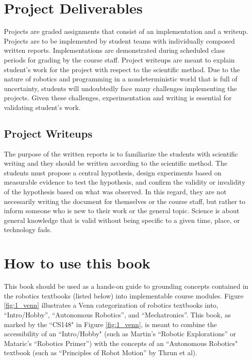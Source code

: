 \section{Project Deliverables}

Projects are graded assignments that consist of an implementation and a writeup.  Projects are to be implemented by student teams with individually composed written reports.  Implementations are demonstrated during scheduled class periods for grading by the course staff.  Project writeups are meant to explain student's work for the project with respect to the scientific method.  Due to the nature of robotics and programming in a nondeterministic world that is full of uncertainty, students will undoubtedly face many challenges implementing the projects. Given these challenges, experimentation and writing is essential for validating student's work.

\subsection{Project Writeups}

The purpose of the written reports is to familiarize the students with scientific writing and they should be written according to the scientific method.  The students must propose a central hypothesis, design experiments based on measurable evidence to test the hypothesis, and confirm the validity or invalidity of the hypothesis based on what was observed.  In this regard, they are not necessarily writing the document for themselves or the course staff, but rather to inform someone who is new to their work or the general topic.  Science is about general knowledge that is valid without being specific to a given time, place, or technology fads.

\section{How to use this book}

This book should be used as a hands-on guide to grounding concepts contained in the robotics textbooks (listed below) into implementable course modules.  Figure \ref{fig:1_venn} illustrates a Venn categorization of 
robotics textbooks into, ``Intro/Hobby'', ``Autonomous Robotics'', and ``Mechatronics''.  This book, as marked by the ``CS148" in Figure \ref{fig:1_venn}, is meant to combine the accessibility of an ``Intro/Hobby" (such as Martin's ``Robotic Explorations'' or Mataric's ``Robotics Primer'') with the concepts of an ``Autonomous Robotics" textbook (such as ``Principles of Robot Motion'' by Thrun et al). 

